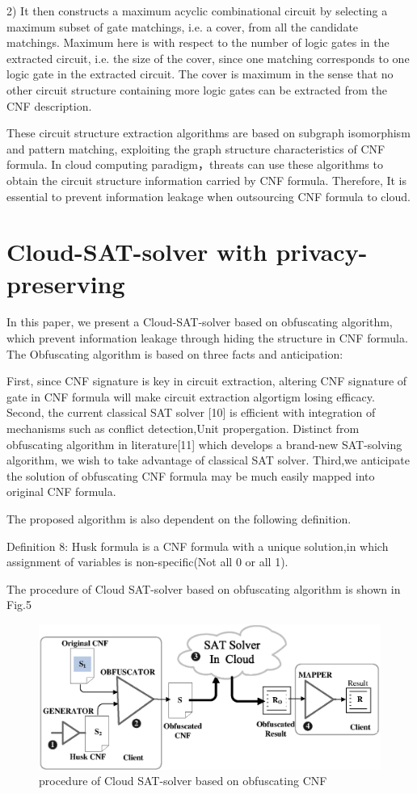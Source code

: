 \documentclass[runningheads,a4paper]{llncs}
\begin{document}
2) It then constructs a maximum acyclic combinational circuit by selecting a maximum subset of gate matchings, i.e. a cover, from all the candidate matchings. Maximum here is with respect to the number of logic gates in the extracted circuit, i.e. the size of the cover, since one matching corresponds to one logic gate in the extracted circuit. The cover is maximum in the sense that no other circuit structure containing more logic gates can be extracted from the CNF description.

These circuit structure extraction algorithms are based on subgraph isomorphism and pattern matching, exploiting the graph structure characteristics of CNF formula. In cloud computing paradigm，threats can use these algorithms to obtain the circuit structure information carried by CNF formula. Therefore, It is essential to prevent information leakage when outsourcing CNF formula to cloud.

\section{Cloud-SAT-solver with privacy-preserving}

In this paper, we present a Cloud-SAT-solver based on obfuscating algorithm, which prevent information leakage through hiding the structure in CNF formula.
The Obfuscating algorithm is based on three facts and anticipation:

First, since CNF signature is key in circuit extraction, altering CNF signature of gate in CNF formula will make circuit extraction algortigm losing efficacy.
Second, the current classical SAT solver [10] is efficient with integration of mechanisms such as conflict detection,Unit propergation.
Distinct from obfuscating algorithm in literature[11] which develops a brand-new SAT-solving algorithm, we wish to take advantage of classical SAT solver.
Third,we anticipate the solution of obfuscating CNF formula may be much easily mapped into original CNF formula.

The proposed algorithm is also dependent on the following definition.

\noindent Definition 8: Husk formula is a CNF formula with a unique solution,in which assignment of variables is non-specific(Not all 0 or all 1).

The procedure of Cloud SAT-solver based on obfuscating algorithm is shown in Fig.5
\begin{figure}
\centering
\includegraphics[width=11.2cm]{a5}
\caption{procedure of Cloud SAT-solver based on obfuscating CNF}
\end{figure}
\end{document}
